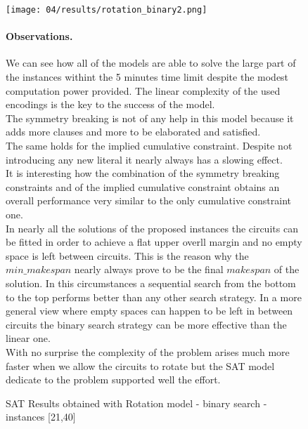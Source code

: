   \begin{figure}[H]
    \centering
    \texttt{[image: 04/results/rotation\_binary2.png]}
    \caption{
      SAT Results obtained with Rotation model - binary search - instances [21,40]
    }
    \label{fig:SAT_results_rotation_binary2}



  \paragraph{Observations.}
  \raggedright
    We can see how all of the models are able to solve the large part
    of the instances withint the 5 minutes time limit despite the modest
    computation power provided. The linear complexity of the used
    encodings is the key to the success of the model.\\

    The symmetry breaking is not of any help in this model because it adds
    more clauses and more to be elaborated and satisfied.\\
    The same holds for the implied cumulative constraint. Despite 
    not introducing any new literal it nearly always has a slowing effect.\\

    It is interesting how the combination of the symmetry breaking constraints
    and of the implied cumulative constraint obtains an overall performance 
    very similar to the only cumulative constraint one.\\

    In nearly all the solutions of the proposed instances the circuits can be
    fitted in order to achieve a flat upper overll margin and no empty space 
    is left between circuits. This is the reason why the \(min\_makespan\) nearly
    always prove to be the final \(makespan\) of the solution.
    In this circumstances a sequential search from the bottom to the top performs 
    better than any other search strategy. In a more general view where empty spaces
    can happen to be left in between circuits the binary search strategy can be
    more effective than the linear one.\\

    With no surprise the complexity of the problem arises much more faster when we
    allow the circuits to rotate but the SAT model dedicate to the problem supported
    well the effort.


  \end{figure}